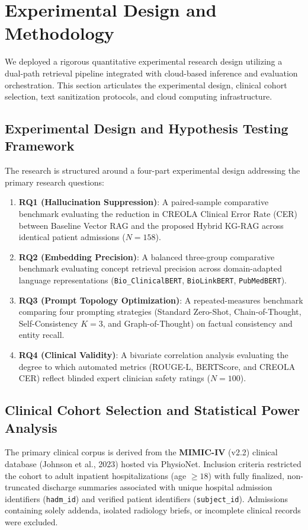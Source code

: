 \documentclass[11pt, a4paper]{article}
\begin{document}
\section{Experimental Design and Methodology}
We deployed a rigorous quantitative experimental research design utilizing a dual-path retrieval pipeline integrated with cloud-based inference and evaluation orchestration. This section articulates the experimental design, clinical cohort selection, text sanitization protocols, and cloud computing infrastructure.

\subsection{Experimental Design and Hypothesis Testing Framework}
The research is structured around a four-part experimental design addressing the primary research questions:
\begin{enumerate}
  \item \textbf{RQ1 (Hallucination Suppression)}: A paired-sample comparative benchmark evaluating the reduction in CREOLA Clinical Error Rate (CER) between Baseline Vector RAG and the proposed Hybrid KG-RAG across identical patient admissions ($N = 158$).
  \item \textbf{RQ2 (Embedding Precision)}: A balanced three-group comparative benchmark evaluating concept retrieval precision across domain-adapted language representations (\texttt{Bio\_ClinicalBERT}, \texttt{BioLinkBERT}, \texttt{PubMedBERT}).
  \item \textbf{RQ3 (Prompt Topology Optimization)}: A repeated-measures benchmark comparing four prompting strategies (Standard Zero-Shot, Chain-of-Thought, Self-Consistency $K=3$, and Graph-of-Thought) on factual consistency and entity recall.
  \item \textbf{RQ4 (Clinical Validity)}: A bivariate correlation analysis evaluating the degree to which automated metrics (ROUGE-L, BERTScore, and CREOLA CER) reflect blinded expert clinician safety ratings ($N = 100$).
\end{enumerate}

\subsection{Clinical Cohort Selection and Statistical Power Analysis}
The primary clinical corpus is derived from the \textbf{MIMIC-IV} (v2.2) clinical database (Johnson et al., 2023) hosted via PhysioNet. Inclusion criteria restricted the cohort to adult inpatient hospitalizations (age $\ge 18$) with fully finalized, non-truncated discharge summaries associated with unique hospital admission identifiers (\texttt{hadm\_id}) and verified patient identifiers (\texttt{subject\_id}). Admissions containing solely addenda, isolated radiology briefs, or incomplete clinical records were excluded.
\end{document}
